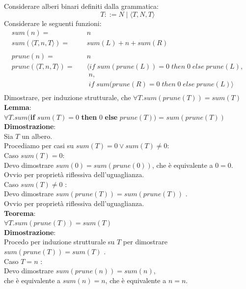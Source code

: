 \documentclass[
  a4paper,
]{article}
\begin{document}
\begin{examplebox}

Considerare alberi binari definiti dalla grammatica: \[
T ::= N \; | \; \langle T, N, T \rangle
\] \[
\] Considerare le seguenti funzioni: \[
\begin{aligned}
sum(n) = & \quad n  \\
sum(\langle T, n, T \rangle) = &  \quad sum(L) + n + sum(R)  
\\ \\
prune(n) = & \quad n     \\
prune(\langle T, n, T \rangle) =
& \quad \langle if \; sum(prune(L)) = 0 \;then \; 0 \; else \; prune(L), \\
& \quad \;  n,\\
& \quad \; if \; sum(prune(R) = 0 \; then \; 0 \; else \; prune(L) \rangle \\
\end{aligned}
\] \[
\] Dimostrare, per induzione strutturale, che
\(\forall T. sum(prune(T)) = sum(T)\) \[
\] \textbf{Lemma}:\\
\(\forall T. sum(\)\textbf{if} \(sum(T) = 0\) \textbf{then} \(0\)
\textbf{else} \(prune(T))\) = \(sum(prune(T))\)\\
\textbf{Dimostrazione}:\\
Sia \(T\) un albero.\\
Procediamo per casi su \(sum(T) = 0 \lor sum(T) \not = 0\):\\
Caso \(sum(T) = 0\):\\
Devo dimostrare \(sum(0) = sum(prune(0))\), che è equivalente a
\(0 = 0\).\\
Ovvio per proprietà riflessiva dell'uguaglianza.\\
Caso \(sum(T) \not = 0\) :\\
Devo dimostrare \(sum(prune(T)) = sum(prune(T))\) .\\
Ovvio per proprietà riflessiva dell'uguaglianza.\\
\[
\] \textbf{Teorema}:\\
\(\forall T. sum(prune(T)) = sum(T)\)\\
\textbf{Dimostrazione}:\\
Procedo per induzione strutturale su \(T\) per dimostrare
\(sum(prune(T)) = sum(T)\) .\\
Caso \(T = n\) :\\
Devo dimostrare \(sum(prune(n)) = sum(n)\),\\
che è equivalente a \(sum(n) = n\), che è equivalente a \(n = n\).\\

\end{examplebox}
\end{document}
